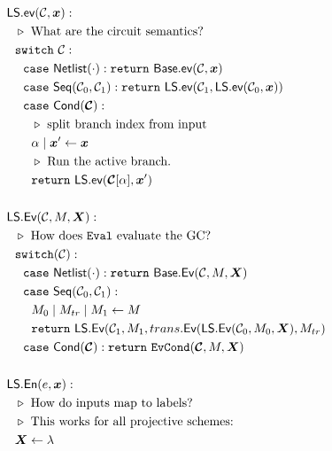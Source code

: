 \begin{figure}
  \begin{adjustwidth}{-0.1\textwidth}{-0.1\textwidth}
  \centering
  \begin{minipage}[t]{0.56\linewidth}
    \begin{align*}
      &\ourscheme.\gev(\cir, \cirinp):\\
      &~~\codecomment{What are the circuit semantics?}\\
      &~~\switch~\cir:\\
      &~~~~\ccase~\netlist(\cdot): \creturn~\underscheme.\gev(\cir, \cirinp)\\
      &~~~~\ccase~\sequential(\cir_0, \cir_1):
      \creturn~\ourscheme.\gev(\cir_1, \ourscheme.\gev(\cir_0,
      \cirinp))\\
      &~~~~\ccase~\conditional(\vec{\cir}):\\
      &~~~~~~\codecomment{split branch index from input}\\
      &~~~~~~\aid\mid\cirinp' \gets \cirinp\\
      &~~~~~~\codecomment{Run the active branch.}\\
      &~~~~~~\creturn~\ourscheme.\gev(\vec{\cir}[\aid], \cirinp')\\
      \\
      &\ourscheme.\gEv(\cir,\mat,\gcirinp):\\
      &~~\codecomment{How does \E evaluate the GC?}\\
      &~~\switch(\cir):\\
      &~~~~\ccase~\netlist(\cdot): \creturn~\underscheme.\gEv(\cir,\mat,\gcirinp)\\
      &~~~~\ccase~\sequential(\cir_0, \cir_1): \\
      &~~~~~~\mat_0\mid\mat_{tr}\mid\mat_1 \gets \mat\\
      &~~~~~~\creturn~\ourscheme.\gEv(\cir_1, \mat_1,
      \evtranslate(\ourscheme.\gEv(\cir_0, \mat_0, \gcirinp), \mat_{tr})\\
      &~~~~\ccase~\conditional(\vec \cir): \creturn~\evcond(\vec \cir,
      \mat, \gcirinp)\\
      \\
      &\ourscheme.\gEn(e,\cirinp):\\
      &~~\codecomment{How do inputs map to labels?}\\
      &~~\codecomment{This works for all projective schemes:}\\
      &~~\gcirinp \gets \emptystring\\

\end{align*}
\end{minipage}
\end{adjustwidth}
\end{figure}

